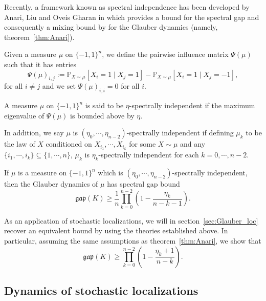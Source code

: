 Recently, a framework known as spectral independence has been developed by Anari, Liu and Oveis Gharan in 
\cite{Anari_2020} which provides a bound for the spectral gap and consequently a mixing bound by 
for the Glauber dynamics (namely, theorem~\ref{thm:Anari}). 

\begin{definition}
  Given a measure \(\mu\) on \(\{-1, 1\}^n\), we define the pairwise influence matrix \(\Psi(\mu)\) 
  such that it has entries 
  \[\Psi(\mu)_{i, j} := \mathbb{P}_{X \sim \mu}[X_i = 1 \mid X_j = 1] - \mathbb{P}_{X \sim \mu}[X_i = 1 \mid X_j = -1],\]
  for all \(i \neq j\) and we set \(\Psi(\mu)_{i, i} = 0\) for all \(i\).
\end{definition}

\begin{definition}
  A measure \(\mu\) on \(\{-1, 1\}^n\) is said to be \(\eta\)-spectrally independent if 
  the maximum eigenvalue of \(\Psi(\mu)\) is bounded above by \(\eta\).

  In addition, we say \(\mu\) is \((\eta_0, \cdots, \eta_{n - 2})\)-spectrally independent if defining 
  \(\mu_k\) to be the law of \(X\) conditioned on \(X_{i_1}, \cdots, X_{i_k}\) for some \(X \sim \mu\) and 
  any \(\{i_1, \cdots, i_k\} \subseteq \{1, \cdots, n\}\), \(\mu_k\) is \(\eta_k\)-spectrally independent 
  for each \(k = 0, \cdots, n - 2\).
\end{definition}

\begin{theorem}\label{thm:Anari}
  If \(\mu\) is a measure on \(\{-1, 1\}^n\) which is \((\eta_0, \cdots, \eta_{n - 2})\)-spectrally 
  independent, then the Glauber dynamics of \(\mu\) has spectral gap bound 
  \[\mathfrak{gap}(K) \ge \frac{1}{n} \prod_{k = 0}^{n - 2}\left(1 - \frac{\eta_k}{n - k - 1}\right).\]
\end{theorem}

As an application of stochastic localizations, we will in section~\ref{sec:Glauber_loc} recover an equivalent 
bound by using the theories established above. In particular, assuming the same assumptions as theorem~\ref{thm:Anari},
we show that 
\[\mathfrak{gap}(K) \ge \prod_{k = 0}^{n - 2}\left(1 - \frac{\eta_k + 1}{n - k}\right).\]


\subsection{Dynamics of stochastic localizations}

